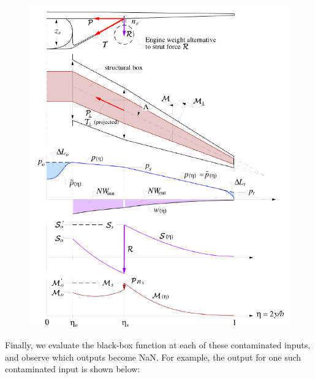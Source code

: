 \begin{figure}[H]
    \centering
    \includegraphics[page=3, width=5in]{../figures/nan-propagation/cropped.pdf}
\end{figure}

Finally, we evaluate the black-box function at each of these contaminated inputs, and observe which outputs become NaN. For example, the output for one such contaminated input is shown below:

